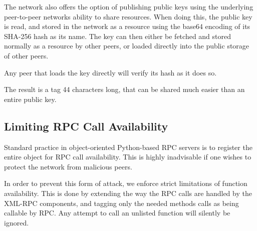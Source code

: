The network also offers the option of publishing public keys using the underlying peer-to-peer networks ability to share resources. When doing this, the public key is read, and stored in the network as a resource using the base64 encoding of its SHA-256 hash as its name. The key can then either be fetched and stored normally as a resource by other peers, or loaded directly into the public storage of other peers.

Any peer that loads the key directly will verify its hash as it does so.

The result is a tag 44 characters long, that can be shared much easier than an entire public key.

\subsection{Limiting RPC Call Availability}

Standard practice in object-oriented Python-based RPC servers is to register the entire object for RPC call availability. This is highly inadvisable if one wishes to protect the network from malicious peers.

In order to prevent this form of attack, we enforce strict limitations of function availability. This is done by extending the way the RPC calls are handled by the XML-RPC components, and tagging only the needed methods calls as being callable by RPC. Any attempt to call an unlisted function will silently be ignored.
